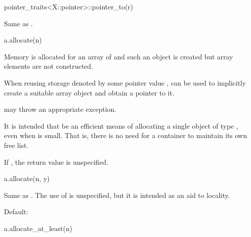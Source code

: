 \begin{itemdecl}
pointer_traits<X::pointer>::pointer_to(r)
\end{itemdecl}

\begin{itemdescr}
\pnum
\result
{}

\pnum
\ensures
Same as .
\end{itemdescr}

\begin{itemdecl}
a.allocate(n)
\end{itemdecl}

\begin{itemdescr}
\pnum
\result
{}

\pnum
\effects
Memory is allocated for an array of  
and such an object is created
but array elements are not constructed.
\begin{example}
When reusing storage denoted by some pointer value ,
can be used to implicitly create a suitable array object
and obtain a pointer to it.
\end{example}

\pnum
\throws
{} may throw an appropriate exception.

\pnum
\begin{note}
It is intended that  be an efficient means
of allocating a single object of type , even when 
is small. That is, there is no need for a container to maintain its own
free list.
\end{note}

\pnum
\remarks
If , the return value is unspecified.
\end{itemdescr}

\begin{itemdecl}
a.allocate(n, y)
\end{itemdecl}

\begin{itemdescr}
\pnum
\result
{}

\pnum
\effects
Same as .
The use of  is unspecified, but it is intended as an aid to locality.

\pnum
\remarks
Default: 
\end{itemdescr}

\begin{itemdecl}
a.allocate_at_least(n)
\end{itemdecl}


